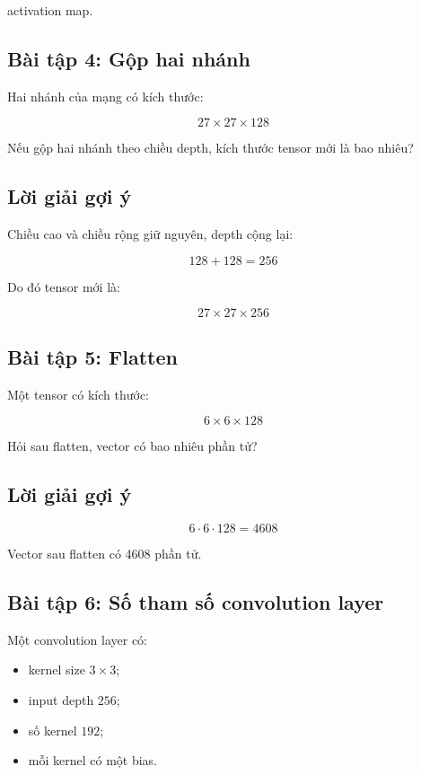 activation map.

\subsection*{Bài tập 4: Gộp hai nhánh}

Hai nhánh của mạng có kích thước:

\[
    27\times27\times128
\]

Nếu gộp hai nhánh theo chiều depth, kích thước tensor mới là bao nhiêu?

\subsection*{Lời giải gợi ý}

Chiều cao và chiều rộng giữ nguyên, depth cộng lại:

\[
    128+128=256
\]

Do đó tensor mới là:

\[
    27\times27\times256
\]

\subsection*{Bài tập 5: Flatten}

Một tensor có kích thước:

\[
    6\times6\times128
\]

Hỏi sau flatten, vector có bao nhiêu phần tử?

\subsection*{Lời giải gợi ý}

\[
    6\cdot6\cdot128=4608
\]

Vector sau flatten có 4608 phần tử.

\subsection*{Bài tập 6: Số tham số convolution layer}

Một convolution layer có:

\begin{itemize}
    \item kernel size $3\times3$;
    \item input depth $256$;
    \item số kernel $192$;
    \item mỗi kernel có một bias.
\end{itemize}

